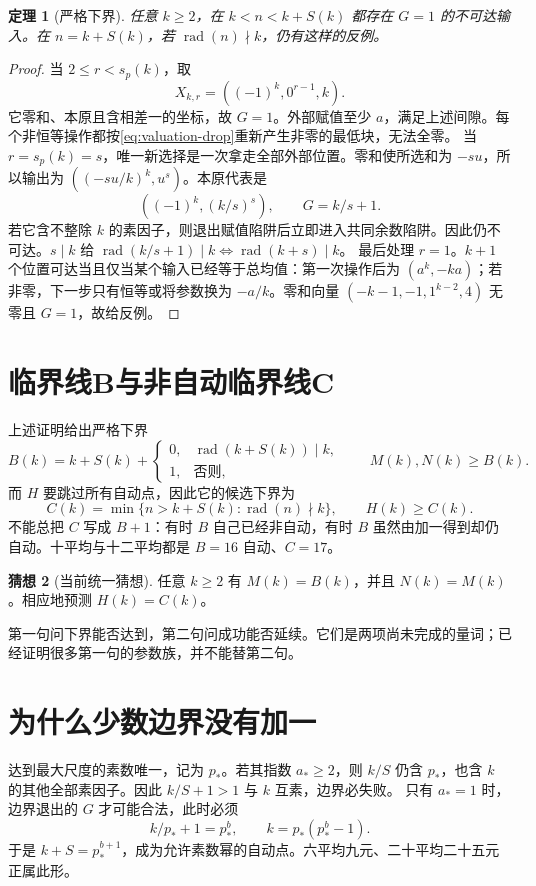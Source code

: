 \documentclass[11pt,a4paper,oneside,openany]{book}
\newcommand{\rad}{\operatorname{rad}}\newcommand{\diag}{\operatorname{diag}}
\newtheorem{theorem}{定理}[chapter]
\theoremstyle{definition}\newtheorem{example}[theorem]{例}\newtheorem{conjecture}[theorem]{猜想}
\numberwithin{equation}{chapter}\setcounter{tocdepth}{1}
\begin{document}
\begin{theorem}[严格下界]
任意 $k\ge2$，在 $k<n<k+S(k)$ 都存在 $G=1$ 的不可达输入。在 $n=k+S(k)$，若 $\rad(n)\nmid k$，仍有这样的反例。
\end{theorem}
\begin{proof}
当 $2\le r<s_p(k)$，取
\[X_{k,r}=((-1)^k,0^{r-1},k).
\]
它零和、本原且含相差一的坐标，故 $G=1$。外部赋值至少 $a$，满足上述间隙。每个非恒等操作都按\eqref{eq:valuation-drop}重新产生非零的最低块，无法全零。
当 $r=s_p(k)=s$，唯一新选择是一次拿走全部外部位置。零和使所选和为 $-su$，所以输出为 $((-su/k)^k,u^s)$。本原代表是
\[((-1)^k,(k/s)^s),\qquad G=k/s+1.
\]
若它含不整除 $k$ 的素因子，则退出赋值陷阱后立即进入共同余数陷阱。因此仍不可达。$s\mid k$ 给 $\rad(k/s+1)\mid k\iff\rad(k+s)\mid k$。
最后处理 $r=1$。$k+1$ 个位置可达当且仅当某个输入已经等于总均值：第一次操作后为 $(a^k,-ka)$；若非零，下一步只有恒等或将参数换为 $-a/k$。零和向量 $(-k-1,-1,1^{k-2},4)$ 无零且 $G=1$，故给反例。
\end{proof}

\section{临界线B与非自动临界线C}
上述证明给出严格下界
\begin{equation}\label{eq:B}
B(k)=k+S(k)+\begin{cases}0,&\rad(k+S(k))\mid k,\\1,&\text{否则},\end{cases}
\qquad M(k),N(k)\ge B(k).
\end{equation}
而 $H$ 要跳过所有自动点，因此它的候选下界为
\begin{equation}\label{eq:C}
C(k)=\min\{n>k+S(k):\rad(n)\nmid k\},\qquad H(k)\ge C(k).
\end{equation}
不能总把 $C$ 写成 $B+1$：有时 $B$ 自己已经非自动，有时 $B$ 虽然由加一得到却仍自动。十平均与十二平均都是 $B=16$ 自动、$C=17$。

\begin{conjecture}[当前统一猜想]
任意 $k\ge2$ 有 $M(k)=B(k)$，并且 $N(k)=M(k)$。相应地预测 $H(k)=C(k)$。
\end{conjecture}
第一句问下界能否达到，第二句问成功能否延续。它们是两项尚未完成的量词；已经证明很多第一句的参数族，并不能替第二句。

\section{为什么少数边界没有加一}
达到最大尺度的素数唯一，记为 $p_*$。若其指数 $a_*\ge2$，则 $k/S$ 仍含 $p_*$，也含 $k$ 的其他全部素因子。因此 $k/S+1>1$ 与 $k$ 互素，边界必失败。
只有 $a_*=1$ 时，边界退出的 $G$ 才可能合法，此时必须
\[k/p_*+1=p_*^b,\qquad k=p_*(p_*^b-1).
\]
于是 $k+S=p_*^{b+1}$，成为允许素数幂的自动点。六平均九元、二十平均二十五元正属此形。
\end{document}

